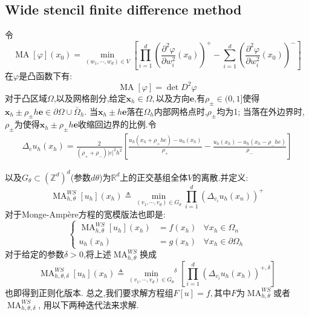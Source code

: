 \documentclass[11pt]{article}
\begin{document}
\subsection{Wide stencil finite difference method}
令$$\operatorname{MA} [\varphi] \left(x_{0}\right)=\min _{\left(w_{1}, \cdots, w_{d}\right) \in V}\left[\prod_{i=1}^{d}\left(\frac{\partial^{2} \varphi}{\partial w_{i}^{2}}\left(x_{0}\right)\right)^{+}-\sum_{i=1}^{d}\left(\frac{\partial^{2} \varphi}{\partial w_{i}^{2}}\left(x_{0}\right)\right)^{-}\right]$$
在$\varphi$是凸函数下有:
$$\operatorname{MA}[\varphi]=\operatorname{det}D^2\varphi$$
对于凸区域$\Omega$,以及网格剖分,给定$\bm{x}_h\in \Omega,$以及方向$\bm{e}$,有$\rho_\pm\in(0,1]$使得$\bm{x}_h\pm \rho_\pm h\bm{e}\in\partial\Omega\cup\bar{\Omega}_h$. 当$\bm{x}_h\pm  h\bm{e}$落在$\Omega_h$内部网格点时,$\rho_\pm$均为1; 当落在外边界时,$\rho_\pm$为使得$\bm{x}_h\pm \rho_\pm h\bm{e}$收缩回边界的比例.令
\begin{equation}\label{Delta_eu}
\begin{array}{c}
\Delta_e u_{h}\left(x_{h}\right) = \frac{2}{\left(\rho_{+}+\rho_{-}\right)|e|^{2} h^{2}}\left[\frac{u_{h}\left(x_{h}+\rho_{+} h e\right)-u_{h}\left(x_{h}\right)}{\rho_{+}}-\frac{u_{h}\left(x_{h}\right)-u_{h}\left(x_{h}-\rho_{-} he\right)}{\rho_{-}}\right]
\end{array}
\end{equation}

以及$G_\theta\subset{}(\mathbb{Z}^d)^d$(参数$d\theta$)为$\mathbb{R}^d$上的正交基组全体$V$的离散.并定义:
$$\operatorname{MA}_{h , \theta}^{WS}[u_{h}] \left(x_{h}\right) \triangleq \min _{\left(v_{1}, \cdots,v_d\right) \in G_{\theta}} \prod_{i=1}^{d}\left(\Delta_{v_{i}} u_{h}\left(x_{n}\right)\right)^{+}$$
对于Monge-Ampère方程的宽模版法也即是:
$$\left\{\begin{aligned}
\operatorname{MA}_{h, \theta}^{WS} \left[u_{h}\right]\left(x_{h}\right) &=f\left(x_{h}\right) & \forall x_{h} \in \Omega_{n} \\
u_{h}\left(x_{h}\right) &=g\left(x_{h}\right) &  \forall x_{h} \in \partial\Omega_{h}
\end{aligned}\right.$$
对于给定的参数$\delta>0$,将上述$\operatorname{MA}_{h, \theta}^{WS}$换成
$$\operatorname{MA}_{h,\theta,\delta}^{WS}\left[u_{h}\right]\left(x_{h}\right) \triangleq {\min _{\left(v_{1}, \cdots, v_{d}\right) \in G_{\theta}}}^{\delta}\left[ \prod_{i=1}^{d}\left(\Delta_{v_{i}} u_{h}\left(x_{h}\right)\right)^{+, \delta}\right]$$
也即得到正则化版本.
总之,我们要求解方程组$F[u]=f,$其中$F$为$\operatorname{MA}_{h,\theta}^{WS}$或者$\operatorname{MA}_{h,\theta,\delta}^{WS}$, 用以下两种迭代法来求解.
\end{document}
